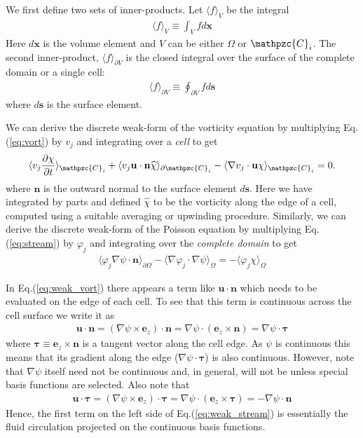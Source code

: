 \documentclass[11pt, reqno]{amsart}
\newcommand{\eqr}[1]{Eq.\thinspace(#1)}
\newcommand{\pfrac}[2]{\frac{\partial #1}{\partial #2}}
\newcommand{\mvec}[1]{\mathbf{#1}}
\newcommand{\gvec}[1]{\boldsymbol{#1}}
\newcommand{\script}[1]{\mathpzc{#1}}
\newcommand{\eez}{\mvec{e}_z}
\newcommand{\iprod}[2]{\langle{#1}\rangle_{#2}}
\theoremstyle{definition}
\begin{document}
We first define two sets of inner-products. Let $\langle f\rangle
_V$ be the integral
\begin{align}
  \langle f\rangle_V \equiv \int_V f d\mvec{x}
\end{align}
Here $d\mvec{x}$ is the volume element and $V$ can be either $\Omega$
or $\script{C}_i$. The second inner-product, $\langle
f\rangle_{\partial V}$ is the closed integral over the surface of the
complete domain or a single cell:
\begin{align}
  \langle f\rangle_{\partial V} \equiv \oint_{\partial V} f
  d\mvec{s}
\end{align}
where $d\mvec{s}$ is the surface element. 

We can derive the discrete weak-form of the vorticity equation by
multiplying \eqr{\ref{eq:vort}} by $v_j$ and integrating over a
\emph{cell} to get
\begin{align}
  \iprod{v_j\pfrac{\chi}{t}}{\script{C}_i} 
  +
  \iprod{v_j\mvec{u}\cdot\mvec{n} \widehat{\chi}}{\partial \script{C}_i}
  -
  \iprod{\nabla v_j\cdot \mvec{u}\chi}{\script{C}_i}
  = 0. \label{eq:weak_vort}
\end{align}
where $\mvec{n}$ is the outward normal to the surface element
$d\mvec{s}$. Here we have integrated by parts and defined
$\widehat{\chi}$ to be the vorticity along the edge of a cell,
computed using a suitable averaging or upwinding procedure. Similarly,
we can derive the discrete weak-form of the Poisson equation by
multiplying \eqr{\ref{eq:stream}} by $\varphi_j$ and integrating over
the \emph{complete domain} to get
\begin{align}
  \iprod{\varphi_j \nabla\psi \cdot \mvec{n}}{\partial \Omega}
  -
  \iprod{\nabla \varphi_j\cdot \nabla\psi}{\Omega}
  =
  -
  \iprod{\varphi_j\chi}{\Omega} \label{eq:weak_stream}
\end{align}

In \eqr{\ref{eq:weak_vort}} there appears a term like
$\mvec{u}\cdot\mvec{n}$ which needs to be evaluated on the edge of
each cell. To see that this term is continuous across the cell surface
we write it as
\begin{align}
  \mvec{u}\cdot\mvec{n}
  = (\nabla\psi\times \eez)\cdot\mvec{n}
  = \nabla\psi\cdot(\eez\times\mvec{n})
  = \nabla\psi\cdot\gvec{\tau}
\end{align}
where $\gvec{\tau} \equiv \eez\times\mvec{n}$ is a tangent vector
along the cell edge. As $\psi$ is continuous this means that its
gradient along the edge ($\nabla\psi\cdot\gvec{\tau}$) is also
continuous. However, note that $\nabla{\psi}$ itself need not be
continuous and, in general, will not be unless special basis functions
are selected. Also note that
\begin{align}
  \mvec{u}\cdot\gvec{\tau}
  = (\nabla\psi\times \eez)\cdot\gvec{\tau}
  = \nabla\psi\cdot(\eez\times\gvec{\tau})
  = -\nabla\psi\cdot\mvec{n}
\end{align}
Hence, the first term on the left side of \eqr{\ref{eq:weak_stream}}
is essentially the fluid circulation projected on the continuous basis
functions.
\end{document}
